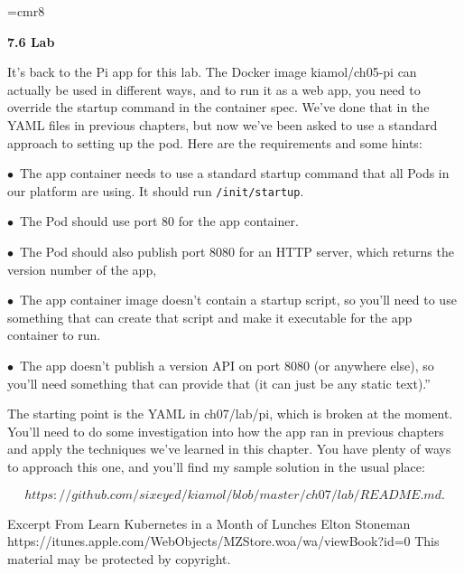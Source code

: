 %

\def\title#1{{\noindent \bf #1}}
\font\eightrm=cmr8
\let\sc=\eightrm %
\def\ll#1{\leftline{\bf#1}}
\def\ttitle#1{\centerline{\bf #1}\bigskip\nobreak}
\def\bs{\bigskip}
\def\ms{\medskip}
\def\ss{\smallskip}
\def\mb{$\bullet$\ }



% 

\twelvepoint


\title{7.6 Lab}

\bs

It’s back to the Pi app for this lab. The Docker image kiamol/ch05-pi can actually be used in different ways, and to run it as a web app, you need to override the startup command in the container spec. We’ve done that in the YAML files in previous chapters, but now we’ve been asked to use a standard approach to setting up the pod. Here are the requirements and some hints:

\ms

\mb     The app container needs to use a standard startup command that all Pods in our platform are using. It should run {\tt /init/startup}.

\mb   The Pod should use port 80 for the app container.

\mb     The Pod should also publish port 8080 for an HTTP server, which returns the version number of the app,

\mb The app container image doesn’t contain a startup script, so you’ll need to use something that can create that script and make it executable for the app container to run.

\mb  The app doesn’t publish a version API on port 8080 (or anywhere else), so you’ll need something that can provide that (it can just be any static text).”

\ms

\noindent The starting point is the YAML in ch07/lab/pi, which is broken
at the moment. You’ll need to do some investigation into how the
app ran in previous chapters and apply the techniques we’ve learned
in this chapter. You have plenty of ways to approach this one, and
you’ll find my sample solution in the usual place:

$$
https://github.com/sixeyed/kiamol/blob/master/ch07/lab/README.md.
$$


\bye

Excerpt From
Learn Kubernetes in a Month of Lunches
Elton Stoneman
https://itunes.apple.com/WebObjects/MZStore.woa/wa/viewBook?id=0
This material may be protected by copyright.
